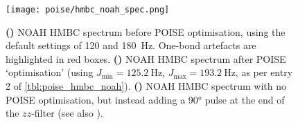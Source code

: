 \begin{figure}[htb]
    \centering
    \texttt{[image: poise/hmbc\_noah\_spec.png]}
    {\label{fig:poise_hmbc_noah_spec_unopt}}
    {\label{fig:poise_hmbc_noah_spec_opt}}
    {\label{fig:poise_hmbc_noah_spec_with90}}
    \caption[Comparison of NOAH HMBC spectra before and after POISE optimisation]{
        \textbf{()} NOAH HMBC spectrum before POISE optimisation, using the default settings of 120 and \SI{180}{\Hz}.
        One-bond artefacts are highlighted in red boxes.
        \textbf{()} NOAH HMBC spectrum after POISE `optimisation' (using $J_\text{min} = \SI{125.2}{\Hz}$, $J_\text{max} = \SI{193.2}{\Hz}$, as per entry 2 of \cref{tbl:poise_hmbc_noah}).
        \textbf{()} NOAH HMBC spectrum with no POISE optimisation, but instead adding a \ang{90} \carbon{} pulse at the end of the $zz$-filter (see also ).
    }
    \label{fig:poise_hmbc_noah_spec}
\end{figure}
